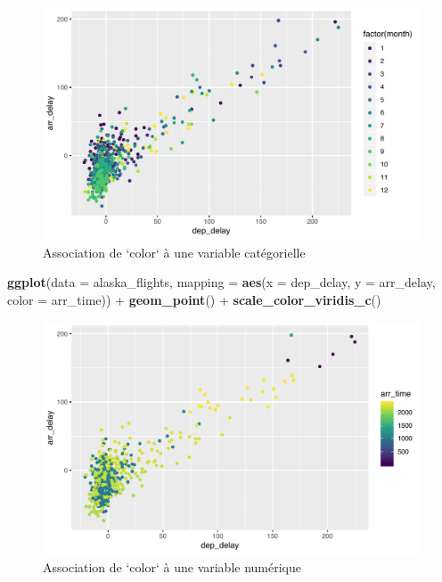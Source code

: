 \documentclass[a4paperpaper,]{article}
\newenvironment{Shaded}{\begin{snugshade}}{\end{snugshade}}
\newcommand{\DataTypeTok}[1]{\textcolor[rgb]{0.00,0.34,0.68}{#1}}
\newcommand{\KeywordTok}[1]{\textcolor[rgb]{0.12,0.11,0.11}{\textbf{#1}}}
\newcommand{\NormalTok}[1]{\textcolor[rgb]{0.12,0.11,0.11}{#1}}
\newcommand{\OperatorTok}[1]{\textcolor[rgb]{0.12,0.11,0.11}{#1}}
\newcommand{\StringTok}[1]{\textcolor[rgb]{0.75,0.01,0.01}{#1}}
\theoremstyle{definition}
\theoremstyle{definition}
\theoremstyle{definition}
\theoremstyle{remark}
\begin{document}
\begin{figure}[htpb]

{\centering \includegraphics[width=0.9\linewidth]{figure/varcolorviridis-1} 

}

\caption{Association de `color` à une variable catégorielle}\label{fig:varcolorviridis}
\end{figure}

\begin{Shaded}
\begin{Highlighting}[]
\KeywordTok{ggplot}\NormalTok{(}\DataTypeTok{data =}\NormalTok{ alaska_flights, }\DataTypeTok{mapping =} \KeywordTok{aes}\NormalTok{(}\DataTypeTok{x =}\NormalTok{ dep_delay, }\DataTypeTok{y =}\NormalTok{ arr_delay, }\DataTypeTok{color =}\NormalTok{ arr_time)) }\OperatorTok{+}
\StringTok{  }\KeywordTok{geom_point}\NormalTok{() }\OperatorTok{+}
\StringTok{  }\KeywordTok{scale_color_viridis_c}\NormalTok{()}
\end{Highlighting}
\end{Shaded}

\begin{figure}[htpb]

{\centering \includegraphics[width=0.9\linewidth]{figure/varcolorviridis2-1} 

}

\caption{Association de `color` à une variable numérique}\label{fig:varcolorviridis2}
\end{figure}
\end{document}
